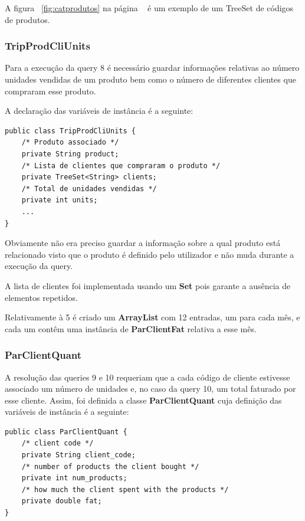 \documentclass[10pt] {article}
\begin{document}
A figura ~\ref{fig:catprodutos} na página ~\pageref{fig:catprodutos} é um exemplo de um TreeSet de códigos de produtos.

\subsubsection{TripProdCliUnits}

Para a execução da query 8 é necessário guardar informações relativas ao número unidades vendidas de um produto
bem como o número de diferentes clientes que compraram esse produto.

A declaração das variáveis de instância é a seguinte:

\begin{lstlisting}
public class TripProdCliUnits {
	/* Produto associado */
	private String product;
	/* Lista de clientes que compraram o produto */
	private TreeSet<String> clients;
	/* Total de unidades vendidas */
	private int units;
	...
}
\end{lstlisting}


Obviamente não era preciso guardar a informação sobre a qual produto está relacionado visto que o produto é definido pelo utilizador e não muda durante a execução da query.

A lista de clientes foi implementada usando um \textbf{Set} pois garante a ausência de elementos repetidos.

Relativamente à 5 é criado um \textbf{ArrayList} com 12 entradas, um para cada mês, e cada um contêm uma
instância de \textbf{ParClientFat} relativa a esse mês.

\subsubsection{ParClientQuant}

A resolução das queries 9 e 10 requeriam que a cada código de cliente estivesse associado um número de unidades e, no caso da query 10, um total faturado por esse cliente. Assim, foi definida a classe \textbf{ParClientQuant} cuja
definição das variáveis de instância é a seguinte:

\begin{lstlisting}
public class ParClientQuant {
    /* client code */
	private String client_code;
	/* number of products the client bought */
    private int num_products;
    /* how much the client spent with the products */
    private double fat;
}
\end{lstlisting}
\end{document}
